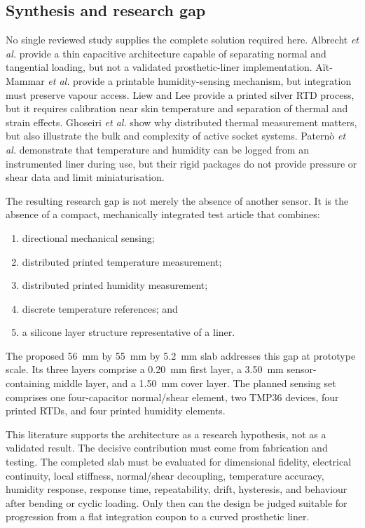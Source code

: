 \documentclass[12pt,a4paper]{article}
\begin{document}
\subsection{Synthesis and research gap}

No single reviewed study supplies the complete solution required here.
Albrecht \textit{et al.} provide a thin capacitive architecture capable of
separating normal and tangential loading, but not a validated prosthetic-liner
implementation. Aït-Mammar \textit{et al.} provide a printable humidity-sensing
mechanism, but integration must preserve vapour access. Liew and Lee provide a
printed silver RTD process, but it requires calibration near skin temperature
and separation of thermal and strain effects. Ghoseiri \textit{et al.} show why
distributed thermal measurement matters, but also illustrate the bulk and
complexity of active socket systems. Paternò \textit{et al.} demonstrate that
temperature and humidity can be logged from an instrumented liner during use,
but their rigid packages do not provide pressure or shear data and limit
miniaturisation.

The resulting research gap is not merely the absence of another sensor. It is
the absence of a compact, mechanically integrated test article that combines:
\begin{enumerate}[label=(\roman*),leftmargin=2em]
    \item directional mechanical sensing;
    \item distributed printed temperature measurement;
    \item distributed printed humidity measurement;
    \item discrete temperature references; and
    \item a silicone layer structure representative of a liner.
\end{enumerate}
The proposed \SI{56}{\milli\metre} by \SI{55}{\milli\metre} by
\SI{5.2}{\milli\metre} slab addresses this gap at prototype scale. Its three
layers comprise a \SI{0.20}{\milli\metre} first layer, a
\SI{3.50}{\milli\metre} sensor-containing middle layer, and a
\SI{1.50}{\milli\metre} cover layer. The planned sensing set comprises one
four-capacitor normal/shear element, two TMP36 devices, four printed RTDs, and
four printed humidity elements.

This literature supports the architecture as a research hypothesis, not as a
validated result. The decisive contribution must come from fabrication and
testing. The completed slab must be evaluated for dimensional fidelity,
electrical continuity, local stiffness, normal/shear decoupling, temperature
accuracy, humidity response, response time, repeatability, drift, hysteresis,
and behaviour after bending or cyclic loading. Only then can the design be
judged suitable for progression from a flat integration coupon to a curved
prosthetic liner.
\end{document}
